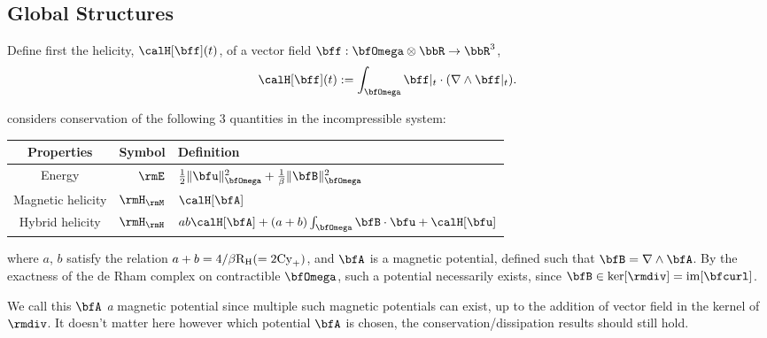 \subsection*{Global Structures}
    Define first the helicity, $\calH[\bff](t)$, of a vector field $\bff : \bfOmega\otimes\bbR \rightarrow \bbR^{3}$, \cite{Moffatt_1969, Brown_Canfield_Pevtsov_1999}
    \begin{equation}
        \calH[\bff](t)  :=  \int_{\bfOmega}\bff|_{t}\cdot(\nabla\wedge\bff|_{t}).
    \end{equation}

    \cite{Laakmann_Hu_Farrell_2022} considers conservation of the following 3 quantities in the incompressible system: 
    \begin{center}\begin{tabular}{ c | r : l }
        Properties  &  Symbol  &  Definition  \\
        \hline\hline
        Energy  &  $\rmE$  &  $\frac{1}{2}\|\bfu\|_{\bfOmega}^{2} + \frac{1}{\beta}\|\bfB\|_{\bfOmega}^{2}$  \\
        \hdashline
        Magnetic helicity  &  $\rmH_{\rmM}$  &  $\calH[\bfA]$  \\
        Hybrid helicity  &  $\rmH_{\rmH}$  &  $ab\calH[\bfA] + (a + b)\int_{\bfOmega}\bfB\cdot\bfu + \calH[\bfu]$
    \end{tabular}\end{center}
    where $a$, $b$ satisfy the relation $a + b  =  4/\beta\mathrm{R}_{\mathrm{H}}  (=  2\mathrm{Cy}_{+})$, and $\bfA$ is a magnetic potential, defined such that $\bfB  =  \nabla\wedge\bfA$. By the exactness of the de Rham complex on contractible $\bfOmega$, such a potential necessarily exists, since $\bfB  \in  \ker[\rmdiv]  =  \im[\bfcurl]$.
    
    \begin{remark}
        We call this $\bfA$ \emph{a} magnetic potential since multiple such magnetic potentials can exist, up to the addition of vector field in the kernel of $\rmdiv$. It doesn't matter here however which potential $\bfA$ is chosen, the conservation/dissipation results should still hold.
    \end{remark}

